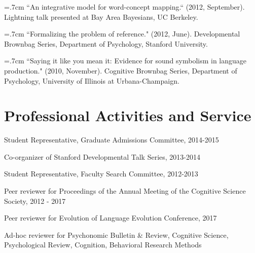 \documentclass[letterpaper]{article}
\renewenvironment{itemize}{
  \begin{list}{}{
    \setlength{\leftmargin}{1.5em}
  }
}{
  \end{list}
}
\begin{document}
 \hangindent=.7cm ``An integrative model for word-concept mapping.`` (2012, September). Lightning talk presented at Bay Area Bayesians, UC Berkeley.

\hangindent=.7cm ``Formalizing the problem of reference."  (2012, June). Developmental Brownbag Series, Department of Psychology, Stanford University.

\hangindent=.7cm ``Saying it like you mean it: Evidence for sound symbolism in language production." (2010, November). Cognitive Brownbag Series, Department of Psychology, University of Illinois at Urbana-Champaign.

 
 \singlespacing


\section*{Professional Activities and Service}
\begin{itemize}
\item Student Representative, Graduate Admissions Committee, 2014-2015
\item Co-organizer of Stanford Developmental Talk Series, 2013-2014
\item Student Representative, Faculty Search Committee, 2012-2013
\item Peer reviewer for Proceedings of the Annual Meeting of the Cognitive Science Society, 2012 - 2017
\item Peer reviewer for Evolution of Language Evolution Conference, 2017
\item Ad-hoc reviewer for Psychonomic Bulletin \& Review, Cognitive Science, Psychological Review, Cognition, Behavioral Research Methods
\end{itemize}

\end{document}
